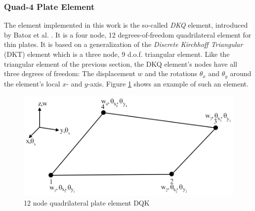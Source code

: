   \subsubsection{Quad-4 Plate Element}
  The element implemented in this work is the so-called \textit{DKQ} element, introduced by Batoz et al. \cite{batoz1982evaluation}. It is a four node, 12 degrees-of-freedom quadrilateral element for thin plates. It is based on a generalization of the \textit{Discrete Kirchhoff Triangular} (DKT) element which is a three node, 9 d.o.f. triangular element. Like the triangular element of the previous section, the DKQ element's nodes have all three degrees of freedom: The displacement $w$ and the rotations $\theta_x$ and $\theta_y$ around the element's local $x$- and $y$-axis. Figure \ref{fig:dkq} shows an example of such an element.
  \begin{figure} %
  	\centering
  	\includegraphics[width=0.97\linewidth]{figures/dkq}
  	\caption{12 node quadrilateral plate element DQK}
  	\label{fig:dkq}
  \end{figure}

